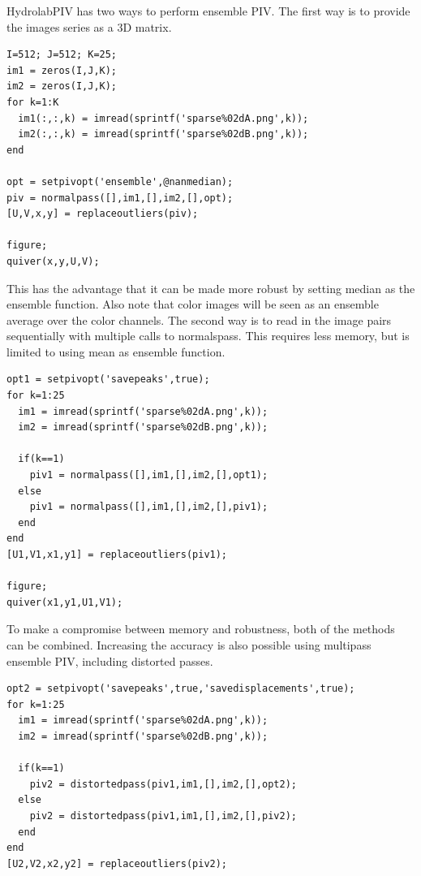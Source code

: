 \documentclass[10pt]{article}
\begin{document}
%
HydrolabPIV has two ways to perform ensemble PIV. The first way is to provide the images series as a 3D matrix.
\begin{lstlisting}[caption=Ensemble PIV]
% Load images
I=512; J=512; K=25;
im1 = zeros(I,J,K);
im2 = zeros(I,J,K);
for k=1:K
  im1(:,:,k) = imread(sprintf('sparse%02dA.png',k));
  im2(:,:,k) = imread(sprintf('sparse%02dB.png',k));  
end

opt = setpivopt('ensemble',@nanmedian);
piv = normalpass([],im1,[],im2,[],opt);
[U,V,x,y] = replaceoutliers(piv);

figure;
quiver(x,y,U,V);
\end{lstlisting}
This has the advantage that it can be made more robust by setting median as the ensemble function.
Also note that color images will be seen as an ensemble average over the color channels.
%
The second way is to read in the image pairs sequentially with multiple calls to normalspass.
This requires less memory, but is limited to using mean as ensemble function.
\begin{lstlisting}[caption=Ensemble PIV (alternative)]
opt1 = setpivopt('savepeaks',true);
for k=1:25
  im1 = imread(sprintf('sparse%02dA.png',k));
  im2 = imread(sprintf('sparse%02dB.png',k));
  
  if(k==1)    
    piv1 = normalpass([],im1,[],im2,[],opt1);
  else
    piv1 = normalpass([],im1,[],im2,[],piv1);
  end
end
[U1,V1,x1,y1] = replaceoutliers(piv1);

figure;
quiver(x1,y1,U1,V1);
\end{lstlisting}
To make a compromise between memory and robustness, both of the methods can be combined.
Increasing the accuracy is also possible using multipass ensemble PIV, including distorted passes.
\begin{lstlisting}[caption=Multipass ensemble PIV]
opt2 = setpivopt('savepeaks',true,'savedisplacements',true);
for k=1:25
  im1 = imread(sprintf('sparse%02dA.png',k));
  im2 = imread(sprintf('sparse%02dB.png',k));
  
  if(k==1)    
    piv2 = distortedpass(piv1,im1,[],im2,[],opt2);
  else
    piv2 = distortedpass(piv1,im1,[],im2,[],piv2);
  end
end
[U2,V2,x2,y2] = replaceoutliers(piv2);
\end{lstlisting}
    
% 
\end{document}
